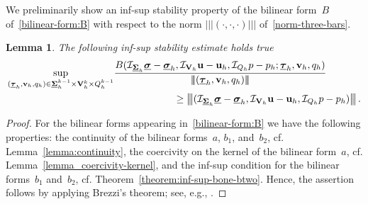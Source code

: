 \documentclass[a4paper,twoside,10pt]{article}
\theoremstyle{plain}
\newtheorem{lemma}[theorem]{Lemma}
\theoremstyle{remark}
\theoremstyle{definition}
\numberwithin{equation}{section}
\numberwithin{figure}{section}
\newcommand{\Normthreebars}[3]{\left|\!\left|\!\left| (#1,#2,#3) \right|\!\right|\!\right|}
\newcommand{\Sigmah}{\underline{\boldsymbol{\Sigma}}_h}
\newcommand{\Sigmahkmo}{\Sigmah^{k-1}}
\newcommand{\Vh}{{\bf{V}}_h}
\newcommand{\Vhk}{\Vh^k}
\newcommand{\Qh}{Q_h}
\newcommand{\Qhkmo}{\Qh^{k-1}}
\newcommand{\taubfh}{\underline{\boldsymbol{\tau}}_h}
\newcommand{\vbfh}{\mathbf{v}_h}
\newcommand{\qh}{q_h}
\newcommand{\sigmabfh}{\underline{\boldsymbol{\sigma}}_h}
\newcommand{\ubfh}{\mathbf{u}_h}
\newcommand{\ph}{p_h}
\newcommand{\sigmabf}{\underline{\boldsymbol{\sigma}}}
\newcommand{\ubf}{\mathbf{u}}
\newcommand{\bone}{b_1}
\newcommand{\btwo}{b_2}
\newcommand{\IcalQhkmo}{\mathcal{I}_{\Qh}}
\newcommand{\IcalVhk}{\mathcal{I}_{\Vh}}
\newcommand{\IcalSigmahkmo}{\mathcal{I}_{\Sigmah}}
\begin{document}
We preliminarily show an inf-sup stability property
of the bilinear form~$B$ of~\eqref{bilinear-form:B}
with respect to the norm $\Normthreebars{\cdot}{\cdot}{\cdot}$ of~\eqref{norm-three-bars}.
\begin{lemma} \label{lemma:inf-sup-product-space}
The following inf-sup stability estimate holds true
\begin{equation*}
\begin{split}
\sup_{(\taubfh,\vbfh,\qh)\in\Sigmahkmo\times\Vhk\times\Qhkmo}
    &\frac{B(\IcalSigmahkmo\sigmabf - \sigmabfh,\IcalVhk\ubf - \ubfh,\IcalQhkmo p - \ph; \taubfh,\vbfh,\qh)}{\Normthreebars{\taubfh}{\vbfh}{\qh}} \\
&\qquad\qquad\qquad\geq \Normthreebars{\IcalSigmahkmo\sigmabf - \sigmabfh}{\IcalVhk\ubf - \ubfh}{\IcalQhkmo p - \ph}.
\end{split}
\end{equation*}
\end{lemma}
\begin{proof}
For the bilinear forms appearing in~\eqref{bilinear-form:B} we have the following properties:
the continuity of the bilinear forms~$a$, $\bone$, and~$\btwo$, cf. Lemma~\ref{lemma:continuity},
the coercivity on the kernel of the bilinear form~$a$, cf. Lemma~\ref{lemma_coercivity-kernel},
and the inf-sup condition for the bilinear forms~$\bone$ and~$\btwo$, cf. Theorem~\ref{theorem:inf-sup-bone-btwo}.
Hence,
the assertion follows by applying 
Brezzi's theorem; see, e.g., \cite{Boffi-Brezzi-Fortin:2013}.
\end{proof}
\end{document}
